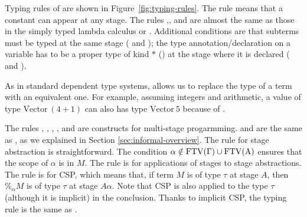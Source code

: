 Typing rules of \LMD are shown in Figure~\ref{fig:typing-rules}.
The rule \TConst{} means that a constant can appear at any stage.
The rules \TVar,\TAbs, and \TApp{} are almost the same as those in the simply typed
lambda calculus or \LLF.  Additional conditions are that subterms must be
typed at the same stage (\TAbs{} and \TApp); the type
annotation/declaration on a variable has to be a proper type of kind
$*$ (\TAbs) at the stage where it is declared (\TVar{} and \TAbs).



As in standard dependent type systems, \TConv{} allows us to replace the type of a term with an equivalent one.
For example, assuming integers and arithmetic, a value of type $\textrm{Vector}\ (4+1)$ can also has type $\textrm{Vector}\ 5$ because of \TConv{}.

The rules \TTB, \TTBL, \TGen, \TIns, and \TCsp{} are constructs for multi-stage progarmming.
\TTB{} and \TTBL{} are the same as \LTP, as we explained in Section \ref{sec:informal-overview}.
The rule \TGen{} for stage abstraction is straightforward.
The condition $\alpha\notin\rm{FTV}(\Gamma)\cup\rm{FTV}(A)$ ensures that the scope of $\alpha$ is in $M$.
The rule \TIns{} is for applications of stages to stage abstractions.
The rule \TCsp{} is for CSP, which means that,
if term $M$ is of type $\tau$ at stage $A$, then $\%_\alpha M$ is of type $\tau$ at stage $A\alpha$.
Note that CSP is also applied to the type \(\tau\) (although it is implicit) in the conclusion.  Thanks to implicit CSP, the typing rule is the same as \LTP.


